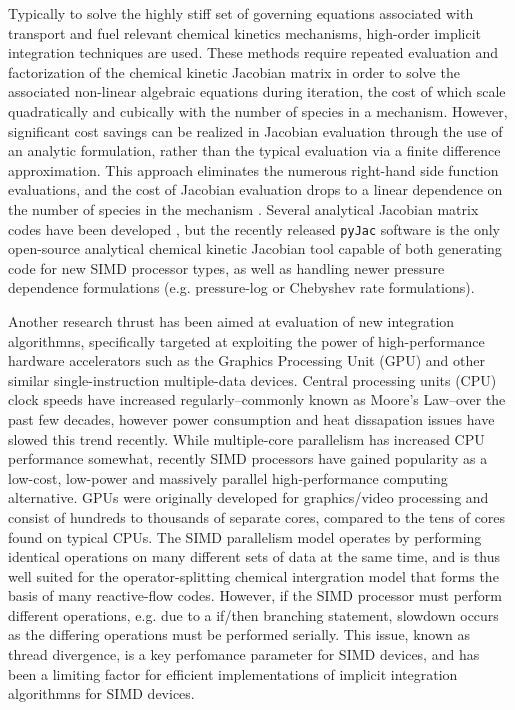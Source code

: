 \documentclass[preprint,12pt]{elsarticle}
\begin{document}
Typically to solve the highly stiff set of governing equations associated with transport and fuel relevant chemical kinetics mechanisms, high-order implicit integration techniques are used.
These methods require repeated evaluation and factorization of the chemical kinetic Jacobian matrix in order to solve the associated non-linear algebraic equations during iteration, the cost of which scale quadratically and cubically with the number of species in a mechanism.
However, significant cost savings can be realized in Jacobian evaluation through the use of an analytic formulation, rather than the typical evaluation via a finite difference approximation.
This approach eliminates the numerous right-hand side function evaluations, and the cost of Jacobian evaluation drops to a linear dependence on the number of species in the mechanism \cite{Lu:2009gh}.
Several analytical Jacobian matrix codes have been developed \cite{Safta:2011vn,Youssefi:2011tm,Bisetti:2012jw,Perini:2012gy,Dijkmans:2014bb}, but the recently released \texttt{pyJac} \cite{Niemeyer:2015im,Niemeyer:2015ws} software is the only open-source analytical chemical kinetic Jacobian tool capable of both generating code for new SIMD processor types, as well as handling newer pressure dependence formulations (e.g. pressure-log or Chebyshev rate formulations).

Another research thrust has been aimed at evaluation of new integration algorithmns, specifically targeted at exploiting the power of high-performance hardware accelerators such as the Graphics Processing Unit (GPU) and other similar single-instruction multiple-data devices.
Central processing units (CPU) clock speeds have increased regularly--commonly known as Moore's Law--over the past few decades, however power consumption and heat dissapation issues have slowed this trend recently.
While multiple-core parallelism has increased CPU performance somewhat, recently SIMD processors have gained popularity as a low-cost, low-power and massively parallel high-performance computing alternative.
GPUs were originally developed for graphics/video processing and consist of hundreds to thousands of separate cores, compared to the tens of cores found on typical CPUs.
The SIMD parallelism model operates by performing identical operations on many different sets of data at the same time, and is thus well suited for the operator-splitting chemical intergration model that forms the basis of many reactive-flow codes\cite{Oran:2001aa}.
However, if the SIMD processor must perform different operations, e.g. due to a if/then branching statement, slowdown occurs as the differing operations must be performed serially.
This issue, known as thread divergence, is a key perfomance parameter for SIMD devices, and has been a limiting factor for efficient implementations of implicit integration algorithmns for SIMD devices.
\end{document}
